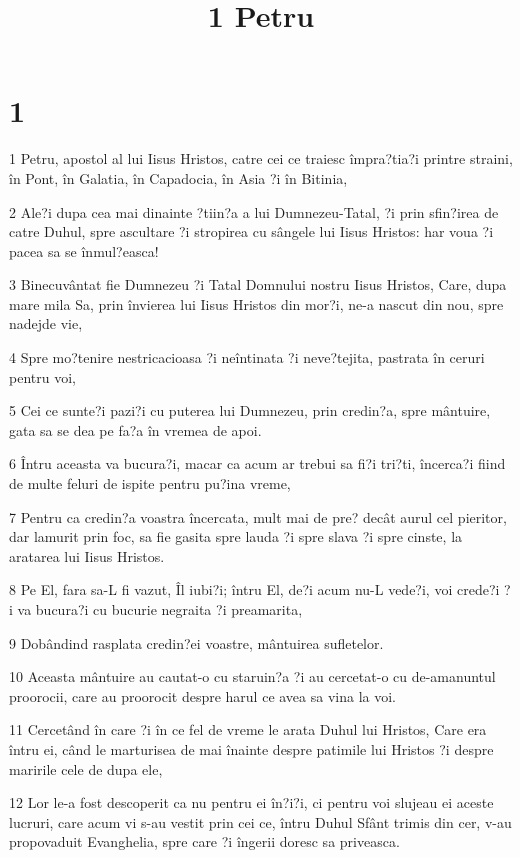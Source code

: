 

\title{1 Petru}


\chapter{1}

\par 1 Petru, apostol al lui Iisus Hristos, catre cei ce traiesc împra?tia?i printre straini, în Pont, în Galatia, în Capadocia, în Asia ?i în Bitinia,
\par 2 Ale?i dupa cea mai dinainte ?tiin?a a lui Dumnezeu-Tatal, ?i prin sfin?irea de catre Duhul, spre ascultare ?i stropirea cu sângele lui Iisus Hristos: har voua ?i pacea sa se înmul?easca!
\par 3 Binecuvântat fie Dumnezeu ?i Tatal Domnului nostru Iisus Hristos, Care, dupa mare mila Sa, prin învierea lui Iisus Hristos din mor?i, ne-a nascut din nou, spre nadejde vie,
\par 4 Spre mo?tenire nestricacioasa ?i neîntinata ?i neve?tejita, pastrata în ceruri pentru voi,
\par 5 Cei ce sunte?i pazi?i cu puterea lui Dumnezeu, prin credin?a, spre mântuire, gata sa se dea pe fa?a în vremea de apoi.
\par 6 Întru aceasta va bucura?i, macar ca acum ar trebui sa fi?i tri?ti, încerca?i fiind de multe feluri de ispite pentru pu?ina vreme,
\par 7 Pentru ca credin?a voastra încercata, mult mai de pre? decât aurul cel pieritor, dar lamurit prin foc, sa fie gasita spre lauda ?i spre slava ?i spre cinste, la aratarea lui Iisus Hristos.
\par 8 Pe El, fara sa-L fi vazut, Îl iubi?i; întru El, de?i acum nu-L vede?i, voi crede?i ?i va bucura?i cu bucurie negraita ?i preamarita,
\par 9 Dobândind rasplata credin?ei voastre, mântuirea sufletelor.
\par 10 Aceasta mântuire au cautat-o cu staruin?a ?i au cercetat-o cu de-amanuntul proorocii, care au proorocit despre harul ce avea sa vina la voi.
\par 11 Cercetând în care ?i în ce fel de vreme le arata Duhul lui Hristos, Care era întru ei, când le marturisea de mai înainte despre patimile lui Hristos ?i despre maririle cele de dupa ele,
\par 12 Lor le-a fost descoperit ca nu pentru ei în?i?i, ci pentru voi slujeau ei aceste lucruri, care acum vi s-au vestit prin cei ce, întru Duhul Sfânt trimis din cer, v-au propovaduit Evanghelia, spre care ?i îngerii doresc sa priveasca.
